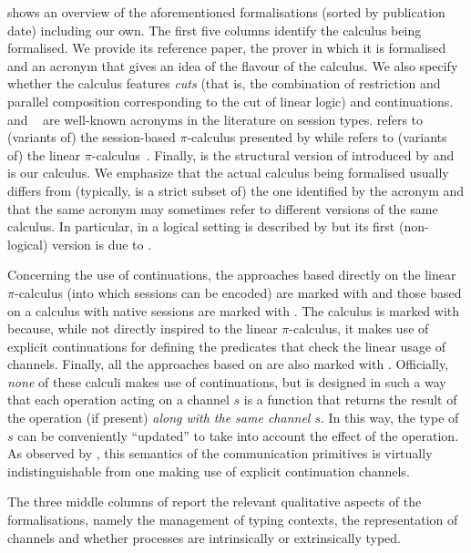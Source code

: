  shows an overview of the aforementioned formalisations
(sorted by publication date) including our own. The first five columns identify
the calculus being formalised. We provide its reference paper, the prover in
which it is formalised and an acronym that gives an idea of the flavour of the
calculus. We also specify whether the calculus features \emph{cuts} (that is,
the combination of restriction and parallel composition corresponding to the cut
of linear logic) and continuations.
%
\CP~\cite{Wadler14,GayVasconcelos25} and \GV~\cite{GayVasconcelos10,Wadler14}
are well-known acronyms in the literature on session types. \SessionPI refers to
(variants of) the session-based $\pi$-calculus presented by
\citet{HondaVasconcelosKubo98} while \LinearPI refers to (variants of) the
linear $\pi$-calculus~\cite{KobayashiPierceTurner99}. Finally, \SCP is the
structural version of \CP introduced by \citet{SanoKavanaghPientka23} and
\Calculus is our calculus.
%
We emphasize that the actual calculus being formalised usually differs from
(typically, is a strict subset of) the one identified by the acronym and that
the same acronym may sometimes refer to different versions of the same calculus.
In particular, \GV in a logical setting is described by \citet{Wadler14} but its
first (non-logical) version is due to \citet{GayVasconcelos10}.

Concerning the use of continuations, the approaches based directly on the linear
$\pi$-calculus (into which sessions can be encoded) are marked with {\YES} and
those based on a calculus with native sessions are marked with {\NO}. The
calculus \SCP is marked with {\MAYBE} because, while not directly inspired to
the linear $\pi$-calculus, it makes use of explicit continuations for defining
the predicates that check the linear usage of channels. Finally, all the
approaches based on \GV are also marked with \MAYBE. Officially, \emph{none} of
these calculi makes use of continuations, but \GV is designed in such a way that
each operation acting on a channel $s$ is a function that returns the result of
the operation (if present) \emph{along with the same channel $s$}. In this way,
the type of $s$ can be conveniently ``updated'' to take into account the effect
of the operation. As observed by \citet{Padovani17}, this semantics of the
communication primitives is virtually indistinguishable from one making use of
explicit continuation channels.

The three middle columns of  report the relevant
qualitative aspects of the formalisations, namely the management of typing
contexts, the representation of channels and whether processes are intrinsically
or extrinsically typed.

